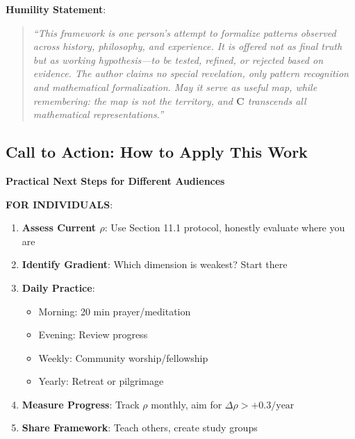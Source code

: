 \documentclass[11pt,a4paper]{article}
\theoremstyle{definition}
\theoremstyle{remark}
\begin{document}
\begin{enumerate}
\begin{protocol}
\begin{mdframed}[backgroundcolor=red!10,linewidth=2pt]
\textbf{Humility Statement}:
\begin{quote}
\textit{``This framework is one person's attempt to formalize patterns observed across history, philosophy, and experience. It is offered not as final truth but as working hypothesis—to be tested, refined, or rejected based on evidence. The author claims no special revelation, only pattern recognition and mathematical formalization. May it serve as useful map, while remembering: the map is not the territory, and \(\mathbf{C}\) transcends all mathematical representations.''}
\end{quote}
\end{mdframed}

\subsection{Call to Action: How to Apply This Work}

\begin{mdframed}[backgroundcolor=green!10,linewidth=2pt]
\textbf{Practical Next Steps for Different Audiences}

\textbf{FOR INDIVIDUALS}:
\begin{enumerate}
    \item \textbf{Assess Current \(\rho\)}: Use Section 11.1 protocol, honestly evaluate where you are
    \item \textbf{Identify Gradient}: Which dimension is weakest? Start there
    \item \textbf{Daily Practice}: 
        \begin{itemize}[nosep]
            \item Morning: 20 min prayer/meditation
            \item Evening: Review progress
            \item Weekly: Community worship/fellowship
            \item Yearly: Retreat or pilgrimage
        \end{itemize}
    \item \textbf{Measure Progress}: Track \(\rho\) monthly, aim for \(\Delta\rho > +0.3/\text{year}\)
    \item \textbf{Share Framework}: Teach others, create study groups
\end{enumerate}


\end{mdframed}
\end{protocol}
\end{enumerate}
\end{document}
